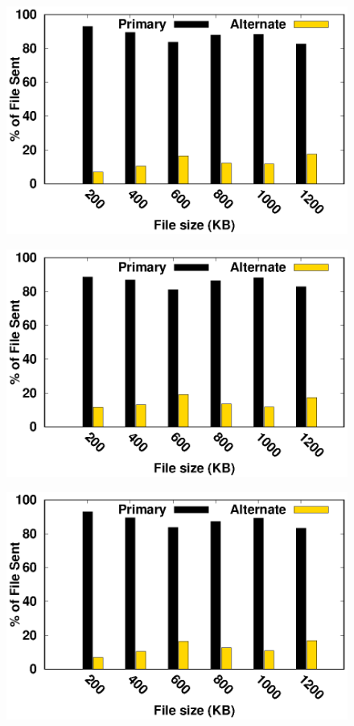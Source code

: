 \begin{figure}[!t]
	\begin{center}
	\begin{minipage}{0.45\linewidth}
		\centering
		\includegraphics[width=\linewidth]{img/exp4/delay-5}
		\label{fig:percentSentOverPathRTT80}
	\end{minipage}
	\begin{minipage}{0.45\linewidth}
		\centering
		\includegraphics[width=\linewidth]{img/exp4/delay-10}
		\label{fig:percentSentOverPathRTT160}
	\end{minipage}
	\begin{minipage}{0.45\linewidth}
		\centering
		\includegraphics[width=\linewidth]{img/exp4/delay-20}

\end{minipage}
\end{center}
\end{figure}

